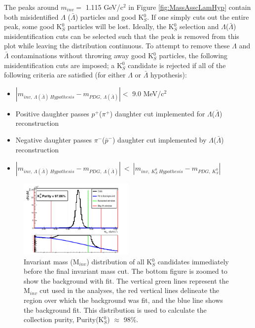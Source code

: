 \documentclass[../AnalysisNoteJBuxton.tex]{subfiles}
\begin{document}
The peaks around $m_{inv} = $ 1.115 GeV/c$^{2}$ in Figure \ref{fig:MassAsscLamHyp} contain both misidentified $\Lambda$ ($\bar{\Lambda}$) particles and good K$^{0}_{S}$.
If one simply cuts out the entire peak, some good K$^{0}_{S}$ particles will be lost.
Ideally, the K$^{0}_{S}$ selection and $\Lambda$($\bar{\Lambda}$) misidentification cuts can be selected such that the peak is removed from this plot while leaving the distribution continuous.
To attempt to remove these $\Lambda$ and $\bar{\Lambda}$ contaminations without throwing away good K$^{0}_{S}$ particles, the following misidentification cuts are imposed; a K$^{0}_{S}$ candidate is rejected if all of the following criteria are satisfied (for either $\Lambda$ or $\bar{\Lambda}$ hypothesis):
\begin{itemize}
 \item $\left|m_{inv, \ \Lambda(\bar{\Lambda}) \ Hypothesis} - m_{PDG,\ \Lambda(\bar{\Lambda})}\right| < $ 9.0 MeV/c$^{2}$
 \item Positive daughter passes $p^{+}$($\pi^{+}$) daughter cut implemented for $\Lambda$($\bar{\Lambda}$) reconstruction
 \item Negative daughter passes $\pi^{-}$($\bar{p}^{-}$) daughter cut implemented by $\Lambda$($\bar{\Lambda}$) reconstruction
 \item $\left|m_{inv, \ \Lambda(\bar{\Lambda}) \ Hypothesis} - m_{PDG,\ \Lambda(\bar{\Lambda})}\right|~ < ~\left|m_{inv,~ K^{0}_{S}~ Hypothesis} - m_{PDG,~ K^{0}_{S}}\right|$
\end{itemize} 


\begin{figure}[h]
  \centering
  \includegraphics[width=0.5\textwidth]{3_DataSelection/Figures/K0Purity_LamK0.pdf}
  \caption[K$^{0}_{S}$ Purity]{Invariant mass (M$_{inv}$) distribution of all K$^{0}_{S}$ candidates immediately before the final invariant mass cut.  The bottom figure is zoomed to show the background with fit.  The vertical green lines represent the M$_{inv}$ cut used in the analyses, the red vertical lines delineate the region over which the background was fit, and the blue line shows the background fit.  This distribution is used to calculate the collection purity, Purity(K$^{0}_{S}$) $\approx$ 98\%.}
  \label{fig:K0Purity}
\end{figure}
\end{document}
